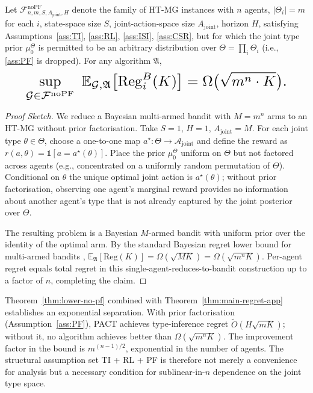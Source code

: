 \begin{theorem}
\label{thm:lower-no-pf}
Let $\mathcal{F}^{\mathrm{noPF}}_{n, m, S, A_{\mathrm{joint}}, H}$ denote the family of HT-MG instances with $n$ agents, $|\Theta_i| = m$ for each $i$, state-space size $S$, joint-action-space size $A_{\mathrm{joint}}$, horizon $H$, satisfying Assumptions~\ref{ass:TI}, \ref{ass:RL}, \ref{ass:ISI}, \ref{ass:CSR}, but for which the joint type prior $\mu_0^\Theta$ is permitted to be an arbitrary distribution over $\Theta = \prod_i \Theta_i$ (i.e., \ref{ass:PF} is dropped). For any algorithm $\mathfrak{A}$,
\begin{equation}\resizebox{0.9\linewidth}{!}{$\displaystyle \sup_{\mathcal{G} \in \mathcal{F}^{\mathrm{noPF}}}\ \mathbb{E}_{\mathcal{G}, \mathfrak{A}}\big[\mathrm{Reg}_i^B(K)\big] = \Omega\big(\sqrt{m^n \cdot K}\big). $}\end{equation}
\end{theorem}

\begin{proof}[Proof Sketch]
We reduce a Bayesian multi-armed bandit with $M = m^n$ arms to an HT-MG without prior factorisation. Take $S = 1$, $H = 1$, $A_{\mathrm{joint}} = M$. For each joint type $\theta \in \Theta$, choose a one-to-one map $a^\star \colon \Theta \to \mathcal{A}_{\mathrm{joint}}$ and define the reward as $r(a, \theta) = \mathbb{1}[a = a^\star(\theta)]$. Place the prior $\mu_0^\Theta$ uniform on $\Theta$ but not factored across agents (e.g., concentrated on a uniformly random permutation of $\Theta$). Conditional on $\theta$ the unique optimal joint action is $a^\star(\theta)$; without prior factorisation, observing one agent's marginal reward provides no information about another agent's type that is not already captured by the joint posterior over $\Theta$.

The resulting problem is a Bayesian $M$-armed bandit with uniform prior over the identity of the optimal arm. By the standard Bayesian regret lower bound for multi-armed bandits \citep[Theorem 15.2]{lattimore2020bandit},
$\mathbb{E}_{\mathfrak{A}}[\mathrm{Reg}(K)] = \Omega(\sqrt{MK}) = \Omega(\sqrt{m^n K})$.
Per-agent regret equals total regret in this single-agent-reduces-to-bandit construction up to a factor of $n$, completing the claim.
\end{proof}

Theorem~\ref{thm:lower-no-pf} combined with Theorem~\ref{thm:main-regret-app} establishes an exponential separation. With prior factorisation (Assumption~\ref{ass:PF}), PACT achieves type-inference regret $\tilde O(H\sqrt{m K})$; without it, no algorithm achieves better than $\Omega(\sqrt{m^n K})$. The improvement factor in the bound is $m^{(n-1)/2}$, exponential in the number of agents. The structural assumption set TI + RL + PF is therefore not merely a convenience for analysis but a necessary condition for sublinear-in-$n$ dependence on the joint type space.

